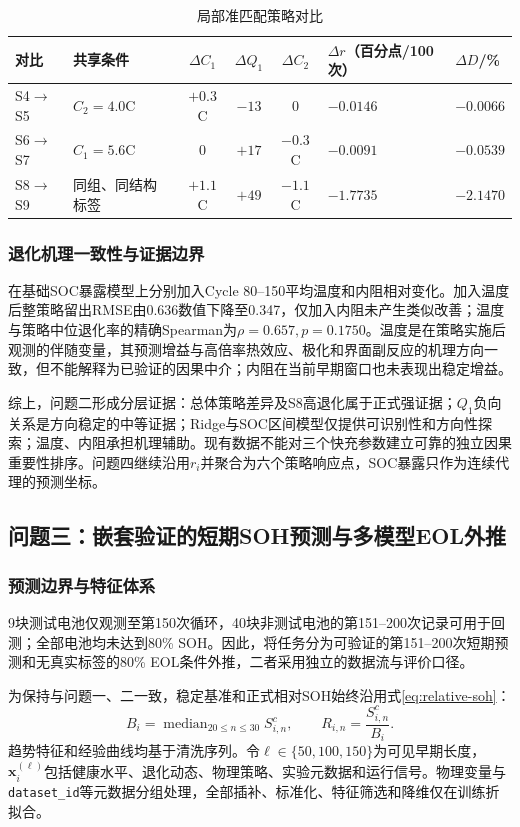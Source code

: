 \documentclass[withoutpreface]{cumcmthesis}
\begin{document}
\begin{table}[htbp]
\centering
\caption{局部准匹配策略对比}
\label{tab:p2localpairs}
\footnotesize
\begin{tabularx}{\textwidth}{p{1.5cm}p{2.5cm}cccXX}
\toprule
对比 & 共享条件 & $\Delta C_1$ & $\Delta Q_1$ & $\Delta C_2$ & $\Delta r$（百分点/100次） & $\Delta D$/\%\\
\midrule
S4$\to$S5 & $C_2=4.0$C & $+0.3$C & $-13$ & 0 & $-0.0146$ & $-0.0066$\\
S6$\to$S7 & $C_1=5.6$C & 0 & $+17$ & $-0.3$C & $-0.0091$ & $-0.0539$\\
S8$\to$S9 & 同组、同结构标签 & $+1.1$C & $+49$ & $-1.1$C & $-1.7735$ & $-2.1470$\\
\bottomrule
\end{tabularx}
\end{table}

\subsubsection{退化机理一致性与证据边界}
在基础SOC暴露模型上分别加入Cycle 80--150平均温度和内阻相对变化。加入温度后整策略留出RMSE由0.636数值下降至0.347，仅加入内阻未产生类似改善；温度与策略中位退化率的精确Spearman为$\rho=0.657,p=0.1750$。温度是在策略实施后观测的伴随变量，其预测增益与高倍率热效应、极化和界面副反应的机理方向一致\cite{koehler2019,operando2022}，但不能解释为已验证的因果中介；内阻在当前早期窗口也未表现出稳定增益。

综上，问题二形成分层证据：总体策略差异及S8高退化属于正式强证据；$Q_1$负向关系是方向稳定的中等证据；Ridge与SOC区间模型仅提供可识别性和方向性探索；温度、内阻承担机理辅助。现有数据不能对三个快充参数建立可靠的独立因果重要性排序。问题四继续沿用$r_i$并聚合为六个策略响应点，SOC暴露只作为连续代理的预测坐标。
\FloatBarrier

\subsection{问题三：嵌套验证的短期SOH预测与多模型EOL外推}
\subsubsection{预测边界与特征体系}
9块测试电池仅观测至第150次循环，40块非测试电池的第151--200次记录可用于回测；全部电池均未达到80\% SOH。因此，将任务分为可验证的第151--200次短期预测和无真实标签的80\% EOL条件外推，二者采用独立的数据流与评价口径。

为保持与问题一、二一致，稳定基准和正式相对SOH始终沿用式\eqref{eq:relative-soh}：
\[
B_i=\operatorname{median}_{20\le n\le30}S^c_{i,n},\qquad
R_{i,n}=\frac{S^c_{i,n}}{B_i}.
\]
趋势特征和经验曲线均基于清洗序列。令$\ell\in\{50,100,150\}$为可见早期长度，$\boldsymbol x_i^{(\ell)}$包括健康水平、退化动态、物理策略、实验元数据和运行信号。物理变量与\texttt{dataset\_id}等元数据分组处理，全部插补、标准化、特征筛选和降维仅在训练折拟合。
\end{document}
